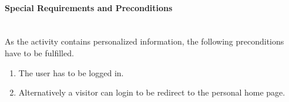 \paragraph*{Special Requirements and Preconditions}\mbox{}\\
As the activity contains personalized information, the following preconditions have to be fulfilled.
\begin{enumerate}
	\vspace{-3mm}
	\setlength\itemsep{-1em}
	\item The user has to be logged in.
	\item Alternatively a visitor can login to be redirect to the personal home page.
\end{enumerate}

